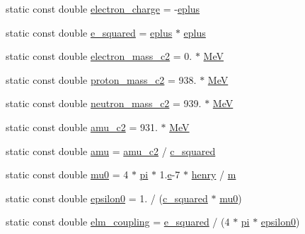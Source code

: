\begin{DoxyCompactItemize}
static const double \hyperlink{namespacedd4hep_ab3cc7a4c1edb82d85112753196db9368}{electron\+\_\+charge} = -\/\hyperlink{namespacedd4hep_a96ccff254b6dcebf179c3630f6205857}{eplus}
\item 
static const double \hyperlink{namespacedd4hep_a23b1828a7d7d90dc182eee3716cf27f6}{e\+\_\+squared} = \hyperlink{namespacedd4hep_a96ccff254b6dcebf179c3630f6205857}{eplus} $\ast$ \hyperlink{namespacedd4hep_a96ccff254b6dcebf179c3630f6205857}{eplus}
\item 
static const double \hyperlink{namespacedd4hep_a90fb8853ce4da9b13bd108593b2d154d}{electron\+\_\+mass\+\_\+c2} = 0. $\ast$ \hyperlink{namespacedd4hep_a6dee62809c6ee54d2fc90671f4dc8b91}{MeV}
\item 
static const double \hyperlink{namespacedd4hep_a368ce1f4ff6406804a6e11ba6c86ea3a}{proton\+\_\+mass\+\_\+c2} = 938. $\ast$ \hyperlink{namespacedd4hep_a6dee62809c6ee54d2fc90671f4dc8b91}{MeV}
\item 
static const double \hyperlink{namespacedd4hep_a9e1f91639c11f55a3550815f9e0fca7d}{neutron\+\_\+mass\+\_\+c2} = 939. $\ast$ \hyperlink{namespacedd4hep_a6dee62809c6ee54d2fc90671f4dc8b91}{MeV}
\item 
static const double \hyperlink{namespacedd4hep_a6bf5b89f5cde619efc44b8b11104932f}{amu\+\_\+c2} = 931. $\ast$ \hyperlink{namespacedd4hep_a6dee62809c6ee54d2fc90671f4dc8b91}{MeV}
\item 
static const double \hyperlink{namespacedd4hep_a0b45315a57cae4bbe7083252cd13f6e8}{amu} = \hyperlink{namespacedd4hep_a6bf5b89f5cde619efc44b8b11104932f}{amu\+\_\+c2} / \hyperlink{namespacedd4hep_a1501a5f994e55104b62b1907ff652300}{c\+\_\+squared}
\item 
static const double \hyperlink{namespacedd4hep_aa3e5df0c9242afa74216e69bac6e639b}{mu0} = 4 $\ast$ \hyperlink{namespacedd4hep_ae71f82066d68af053eb8f60d0e13d3af}{pi} $\ast$ 1.\hyperlink{_volumes_8cpp_a8a9a1f93e9b09afccaec215310e64142}{e}-\/7 $\ast$ \hyperlink{namespacedd4hep_adc130a4b9874431a4fb19fa27220372c}{henry} / \hyperlink{namespacedd4hep_a443d1517e365c8f0c3a498bff0f09088}{m}
\item 
static const double \hyperlink{namespacedd4hep_a7838df71bb4bd46b01798c559daadc4b}{epsilon0} = 1. / (\hyperlink{namespacedd4hep_a1501a5f994e55104b62b1907ff652300}{c\+\_\+squared} $\ast$ \hyperlink{namespacedd4hep_aa3e5df0c9242afa74216e69bac6e639b}{mu0})
\item 
static const double \hyperlink{namespacedd4hep_ace30ae02d909a752d5e3f2138bf4ecb1}{elm\+\_\+coupling} = \hyperlink{namespacedd4hep_a23b1828a7d7d90dc182eee3716cf27f6}{e\+\_\+squared} / (4 $\ast$ \hyperlink{namespacedd4hep_ae71f82066d68af053eb8f60d0e13d3af}{pi} $\ast$ \hyperlink{namespacedd4hep_a7838df71bb4bd46b01798c559daadc4b}{epsilon0})

\end{DoxyCompactItemize}
